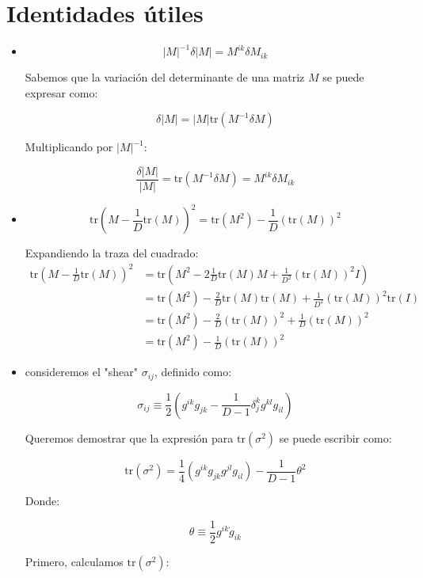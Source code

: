 \documentclass{article}
\begin{document}
\section{Identidades útiles }
\begin{itemize}
  \item 
    \[
    |M|^{-1} \delta |M| = M^{ik} \delta M_{ik}
    \]

    Sabemos que la variación del determinante de una matriz \( M \) se puede expresar como:

    \[
    \delta |M| = |M| \text{tr}(M^{-1} \delta M)
    \]

    Multiplicando por \( |M|^{-1} \):

    \[
    \frac{\delta |M|}{|M|} = \text{tr}(M^{-1} \delta M) = M ^ {ik } \delta M _{ik} 
    \]
  \item 
    \[
    \text{tr} \left( M - \frac{1}{D} \text{tr}(M) \right)^2 = \text{tr}(M^2) - \frac{1}{D} (\text{tr}(M))^2
    \]

    Expandiendo la traza del cuadrado:
    \begin{align*}
      \text{tr} \left( M - \frac{1}{D} \text{tr}(M) \right)^2 &= \text{tr} \left( M^2 - 2\frac{1}{D} \text{tr}(M) M + \frac{1}{D^2} (\text{tr}(M))^2 I \right)\\
              &=\text{tr}(M^2) - \frac{2}{D} \text{tr}(M) \text{tr}(M) + \frac{1}{D^2} (\text{tr}(M))^2 \text{tr}(I)  \\
              &= \text{tr}(M^2) - \frac{2}{D} (\text{tr}(M))^2 + \frac{1}{D} (\text{tr}(M))^2 \\
              &= \text{tr}(M^2) - \frac{1}{D} (\text{tr}(M))^2
    \end{align*}



  \item 
    consideremos el "shear" \(\sigma_{ij}\), definido como:

    \[
    \sigma_{ij} \equiv \frac{1}{2} \left( g^{ik} g_{jk} - \frac{1}{D-1} \delta_j^k g^{kl} g_{il} \right)
    \]

    Queremos demostrar que la expresión para \( \text{tr}(\sigma^2) \) se puede escribir como:

    \[
    \text{tr}(\sigma^2) = \frac{1}{4} \left( g^{ik} g_{jk} g^{jl} g_{il} \right) - \frac{1}{D-1} \theta^2
    \]

    Donde:

    \[
    \theta \equiv \frac{1}{2} g^{ik} \dot{g}_{ik}
    \]

    Primero, calculamos \( \text{tr}(\sigma^2) \):


\end{itemize}
\end{document}
